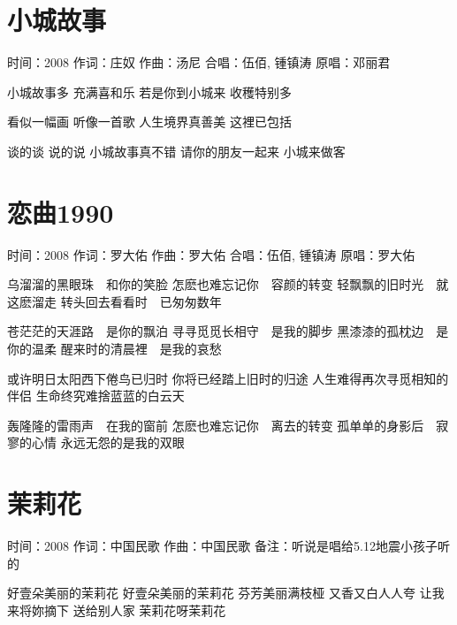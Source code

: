 \documentclass[UTF8,a4paper,oneside,twocolumn,12pt]{ctexbook}
\newcommand{\infopair}[2]{\textbullet #1：#2}
\newcommand{\zc}[1][伍佰]{\infopair{作词}{#1}}
\newcommand{\zq}[1][伍佰]{\infopair{作曲}{#1}}
\newcommand{\yc}[1]{\infopair{原唱}{#1}}
\newcommand{\sj}[1]{\infopair{时间}{#1}}
\newcommand{\bz}[1]{\infopair{备注}{#1}}
\newenvironment{info}{\begin{flushleft}\kaishu
	}
	{\end{flushleft}\normalsize\yahei\par}
\newenvironment{lyric}{
	}
{}
\begin{document}
\section{小城故事}
\begin{info}
	\sj{2008}
	\zc[庄奴]
	\zq[汤尼]
	\infopair{合唱}{伍佰, 锺镇涛}
	\yc{邓丽君}
\end{info}
\begin{lyric}
	小城故事多
	充满喜和乐
	若是你到小城来
	收穫特别多

	看似一幅画
	听像一首歌
	人生境界真善美
	这裡已包括

	谈的谈 说的说
	小城故事真不错
	请你的朋友一起来
	小城来做客
\end{lyric}

\section{恋曲1990}
\begin{info}
	\sj{2008}
	\zc[罗大佑]
	\zq[罗大佑]
	\infopair{合唱}{伍佰, 锺镇涛}
	\yc{罗大佑}
\end{info}
\begin{lyric}
	乌溜溜的黑眼珠　和你的笑脸
	怎麽也难忘记你　容颜的转变
	轻飘飘的旧时光　就这麽溜走
	转头回去看看时　已匆匆数年

	苍茫茫的天涯路　是你的飘泊
	寻寻觅觅长相守　是我的脚步
	黑漆漆的孤枕边　是你的温柔
	醒来时的清晨裡　是我的哀愁

	或许明日太阳西下倦鸟已归时
	你将已经踏上旧时的归途
	人生难得再次寻觅相知的伴侣
	生命终究难捨蓝蓝的白云天

	轰隆隆的雷雨声　在我的窗前
	怎麽也难忘记你　离去的转变
	孤单单的身影后　寂寥的心情
	永远无怨的是我的双眼
\end{lyric}

\section{茉莉花}
\begin{info}
	\sj{2008}
	\zc[中国民歌]
	\zq[中国民歌]
	\bz{听说是唱给5.12地震小孩子听的}
\end{info}
\begin{lyric}
	好壹朵美丽的茉莉花
	好壹朵美丽的茉莉花
	芬芳美丽满枝桠 又香又白人人夸
	让我来将妳摘下 送给别人家
	茉莉花呀茉莉花
\end{lyric}
\end{document}
